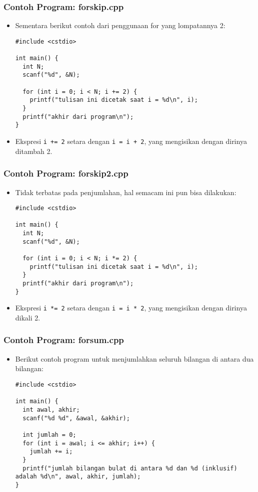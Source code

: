 \begin{frame}[fragile]
\frametitle{Contoh Program: forskip.cpp}
\begin{itemize}
  \item Sementara berikut contoh dari penggunaan for yang lompatannya 2:
\begin{lstlisting}
#include <cstdio>

int main() {
  int N;
  scanf("%d", &N);

  for (int i = 0; i < N; i += 2) {
    printf("tulisan ini dicetak saat i = %d\n", i);
  }
  printf("akhir dari program\n");
}
\end{lstlisting}
  \item Ekspresi \texttt{i += 2} setara dengan \texttt{i = i + 2}, yang mengisikan  dengan dirinya ditambah 2.
\end{itemize}
\end{frame}

\begin{frame}[fragile]
\frametitle{Contoh Program: forskip2.cpp}
\begin{itemize}
  \item Tidak terbatas pada penjumlahan, hal semacam ini pun bisa dilakukan:
\begin{lstlisting}
#include <cstdio>

int main() {
  int N;
  scanf("%d", &N);

  for (int i = 0; i < N; i *= 2) {
    printf("tulisan ini dicetak saat i = %d\n", i);
  }
  printf("akhir dari program\n");
}
\end{lstlisting}
  \item Ekspresi \texttt{i *= 2} setara dengan \texttt{i = i * 2}, yang mengisikan  dengan dirinya dikali 2.
\end{itemize}
\end{frame}


\begin{frame}[fragile]
\frametitle{Contoh Program: forsum.cpp}
\begin{itemize}
  \item Berikut contoh program untuk menjumlahkan seluruh bilangan di antara dua bilangan:
\begin{lstlisting}
#include <cstdio>

int main() {
  int awal, akhir;
  scanf("%d %d", &awal, &akhir);

  int jumlah = 0;
  for (int i = awal; i <= akhir; i++) {
    jumlah += i;
  }
  printf("jumlah bilangan bulat di antara %d dan %d (inklusif) adalah %d\n", awal, akhir, jumlah);
}
\end{lstlisting}
\end{itemize}
\end{frame}

